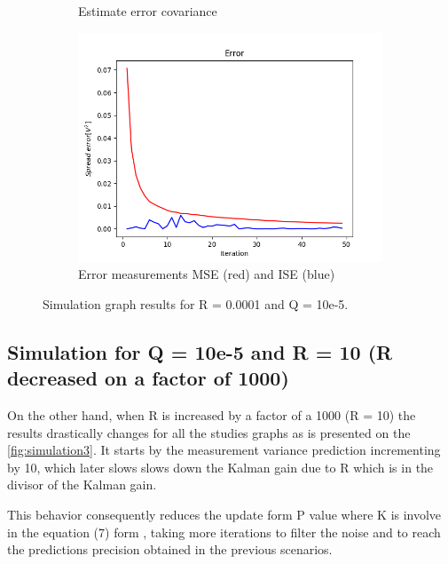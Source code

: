 \documentclass{article}
\begin{document}
\begin{figure}
\begin{subfigure} {.5\textwidth}
            \caption{Estimate error covariance}
        \end{subfigure}
        \begin{subfigure}{.5\textwidth}            
            \centering
            \includegraphics[width=0.8\linewidth]{./img/r00001q_E.png}
            \caption{Error measurements MSE (red) and ISE (blue)}
        \end{subfigure}
        \caption{Simulation graph results for R = 0.0001 and Q = 10e-5.}
        \label{fig:simulation2}
    \end{figure}

    \subsection{Simulation for Q = 10e-5 and R = 10 (R decreased on a factor of 1000)}

    On the other hand, when R is increased by a factor of a 1000 (R = 10) the results drastically changes for
    all the studies graphs as is presented on the \ref{fig:simulation3}. It starts by the measurement variance
    prediction incrementing by 10, which later slows slows down the Kalman gain due to R which is in the divisor
    of the Kalman gain.
    
    This behavior consequently reduces the update form P value where K is involve in the equation (7) form \cite{LabManual},
    taking more iterations to filter the noise and to reach the predictions precision obtained in the 
    previous scenarios.
\end{document}
